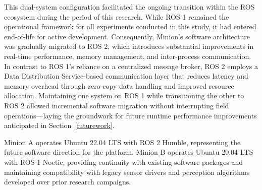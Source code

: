 This dual-system configuration facilitated the ongoing transition within the \ac{ROS} ecosystem during the period of this research.
While \ac{ROS} 1 remained the operational framework for all experiments conducted in this study, it had entered end-of-life for active development.
Consequently, Minion’s software architecture was gradually migrated to \ac{ROS} 2, which introduces substantial improvements in real-time performance, memory management, and inter-process communication.
In contrast to ROS 1’s reliance on a centralized message broker, ROS 2 employs a Data Distribution Service-based communication layer that reduces latency and memory overhead through zero-copy data handling and improved resource allocation.
Maintaining one system on ROS 1 while transitioning the other to ROS 2 allowed incremental software migration without interrupting field operations—laying the groundwork for future runtime performance improvements anticipated in Section~\ref{futurework}.

Minion A operates Ubuntu 22.04 LTS with ROS 2 Humble, representing the future software direction for the platform.
Minion B operates Ubuntu 20.04 LTS with ROS 1 Noetic, providing continuity with existing software packages and maintaining compatibility with legacy sensor drivers and perception algorithms developed over prior research campaigns.




